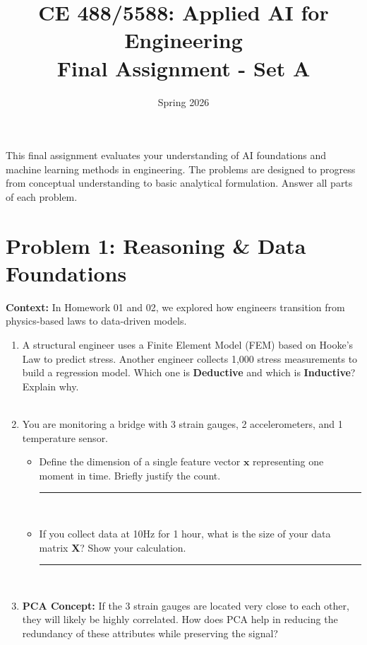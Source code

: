 \documentclass[12pt]{article}
\begin{document}
\title{CE 488/5588: Applied AI for Engineering \\ Final Assignment - Set A}
\author{}
\date{Spring 2026}

\maketitle

\begin{center}
\end{center}

\begin{ch-box}
This final assignment evaluates your understanding of AI foundations and machine learning methods in engineering. The problems are designed to progress from conceptual understanding to basic analytical formulation. Answer all parts of each problem.
\end{ch-box}

\section{Problem 1: Reasoning \& Data Foundations}
\textbf{Context:} In Homework 01 and 02, we explored how engineers transition from physics-based laws to data-driven models. 

\begin{enumerate}[label=(\alph*)]
    \item A structural engineer uses a Finite Element Model (FEM) based on Hooke's Law to predict stress. Another engineer collects 1,000 stress measurements to build a regression model. Which one is \textbf{Deductive} and which is \textbf{Inductive}? Explain why. \\
    \fullunderline \\
    \fullunderline

    \item You are monitoring a bridge with 3 strain gauges, 2 accelerometers, and 1 temperature sensor. 
    \begin{itemize}
        \item Define the dimension of a single feature vector $\bm{x}$ representing one moment in time. Briefly justify the count. \rule{1in}{0.15mm} \\
        \fullunderline
        \item If you collect data at 10Hz for 1 hour, what is the size of your data matrix $\bm{X}$? Show your calculation. \rule{1in}{0.15mm} \\
        \fullunderline
    \end{itemize}

    \item \textbf{PCA Concept:} If the 3 strain gauges are located very close to each other, they will likely be highly correlated. How does PCA help in reducing the redundancy of these attributes while preserving the signal? \\
    \fullunderline \\
    \fullunderline \\
    \fullunderline
\end{enumerate}
\end{document}
